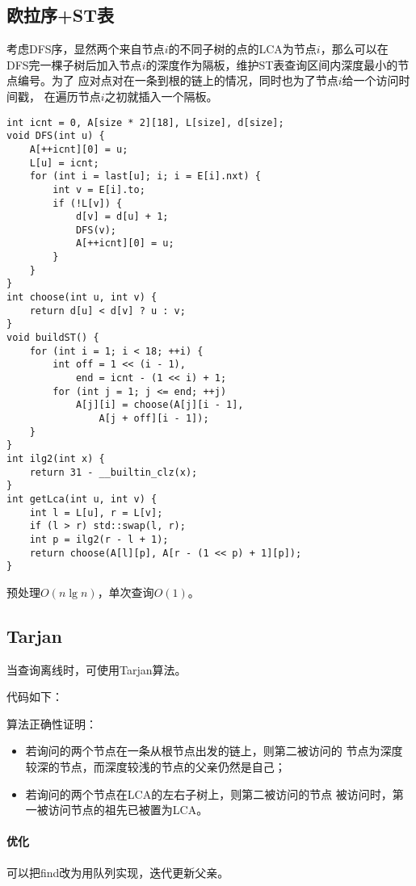 \subsection{欧拉序+ST表}
考虑DFS序，显然两个来自节点$i$的不同子树的点的LCA为节点$i$，那么可以在
DFS完一棵子树后加入节点$i$的深度作为隔板，维护ST表查询区间内深度最小的节点编号。为了
应对点对在一条到根的链上的情况，同时也为了节点$i$给一个访问时间戳，
在遍历节点$i$之初就插入一个隔板。
\begin{lstlisting}
int icnt = 0, A[size * 2][18], L[size], d[size];
void DFS(int u) {
    A[++icnt][0] = u;
    L[u] = icnt;
    for (int i = last[u]; i; i = E[i].nxt) {
        int v = E[i].to;
        if (!L[v]) {
            d[v] = d[u] + 1;
            DFS(v);
            A[++icnt][0] = u;
        }
    }
}
int choose(int u, int v) {
    return d[u] < d[v] ? u : v;
}
void buildST() {
    for (int i = 1; i < 18; ++i) {
        int off = 1 << (i - 1),
            end = icnt - (1 << i) + 1;
        for (int j = 1; j <= end; ++j)
            A[j][i] = choose(A[j][i - 1],
                A[j + off][i - 1]);
    }
}
int ilg2(int x) {
    return 31 - __builtin_clz(x);
}
int getLca(int u, int v) {
    int l = L[u], r = L[v];
    if (l > r) std::swap(l, r);
    int p = ilg2(r - l + 1);
    return choose(A[l][p], A[r - (1 << p) + 1][p]);
}
\end{lstlisting}

预处理$O(n\lg n)$，单次查询$O(1)$。
\subsection{Tarjan}
当查询离线时，可使用Tarjan算法。

代码如下：


算法正确性证明：
\begin{itemize}
    \item 若询问的两个节点在一条从根节点出发的链上，则第二被访问的
    节点为深度较深的节点，而深度较浅的节点的父亲仍然是自己；
    \item 若询问的两个节点在LCA的左右子树上，则第二被访问的节点
    被访问时，第一被访问节点的祖先已被置为LCA。
\end{itemize}

\paragraph{优化} 可以把find改为用队列实现，迭代更新父亲。
